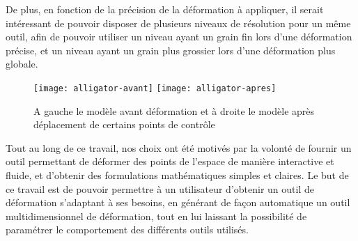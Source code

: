 De plus, en fonction de la précision de la déformation à appliquer, il
serait intéressant de pouvoir disposer de plusieurs niveaux de
résolution pour un même outil, afin de pouvoir utiliser un niveau
ayant un grain fin lors d'une déformation précise, et un niveau ayant
un grain plus grossier lors d'une déformation plus globale.

\begin{figure}[h]
  \texttt{[image: alligator-avant]}
  \texttt{[image: alligator-apres]}
  \caption{A gauche le modèle avant déformation et à droite le modèle
    après déplacement de certains points de contrôle}
  \label{INTall}
\end{figure}

Tout au long de ce travail, nos choix ont été motivés par la volonté
de fournir un outil permettant de déformer des points de l'espace de
manière interactive et fluide, et d'obtenir des formulations
mathématiques simples et claires. Le but de ce travail est de pouvoir
permettre à un utilisateur d'obtenir un outil de déformation
s'adaptant à ses besoins, en générant de façon automatique un outil
multidimensionnel de déformation, tout en lui laissant la possibilité
de paramétrer le comportement des différents outils utilisés.


